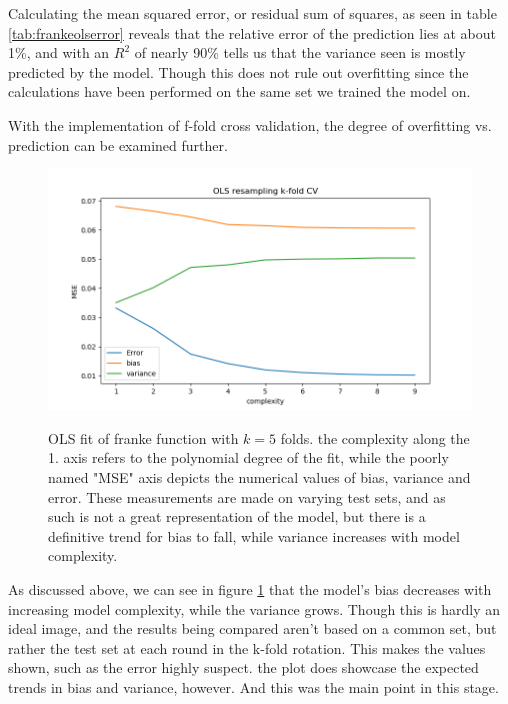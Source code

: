 \documentclass[ 12pt, a4paper ]{article}
\begin{document}
Calculating the mean squared error, or residual sum of squares, as seen in table 
\ref{tab:frankeolserror} reveals that the relative error of the prediction lies at about 1\%, 
and with an $R^2$ of nearly 90\% tells us that the variance seen is mostly predicted by the 
model. Though this does not rule out overfitting since the calculations have been performed on 
the same set we trained the model on. 


With the implementation of f-fold cross validation, the degree of overfitting vs. prediction can
be examined further.

\begin{figure}[H]
\includegraphics[scale=0.7]{frankeolsbiasvariance.png}
\label{fig:frankeolsbiasvariance}
\caption{
    OLS fit of franke function with $k=5$ folds. the complexity along the 1. axis refers
    to the polynomial degree of the fit, while the poorly named "MSE" axis depicts the 
    numerical values of bias, variance and error. These measurements are made on varying test
    sets, and as such is not a great representation of the model, but there is a definitive 
    trend for bias to fall, while variance increases with model complexity.
}
\end{figure}

As discussed above, we can see in figure \ref{fig:frankeolsbiasvariance} that the model's 
bias decreases with increasing model complexity, while the variance grows. Though this is 
hardly an ideal image, and the results being compared aren't based on a common set, but 
rather the test set at each round in the k-fold rotation. This makes the values shown, such 
as the error highly suspect. the plot does showcase the expected trends in bias and variance, 
however. And this was the main point in this stage. \\
\end{document}
